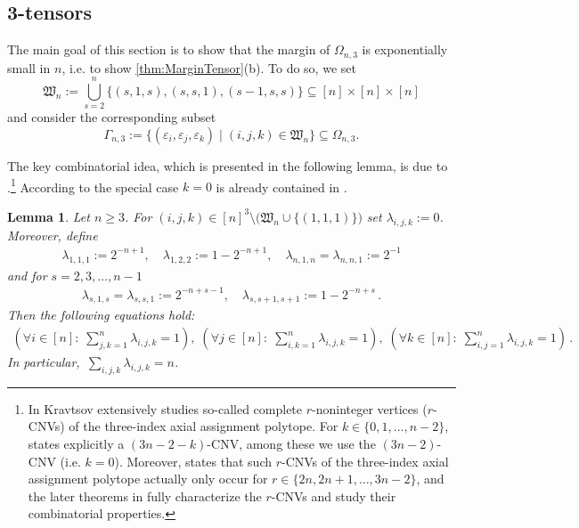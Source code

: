 \documentclass[10pt,a4paper]{article}
\newtheorem{lem}[thm]{Lemma}\crefname{lem}{Lemma}{Lemmas}
\numberwithin{equation}{section}
\newcommand{\eps}{\varepsilon}
\begin{document}
\subsection{3-tensors}\label{sec:3tensors}

The main goal of this section is to show that the margin of $\Omega_{n,3}$ is exponentially small in $n$, i.e. to show \cref{thm:MarginTensor}(b). To do so, we set
\begin{equation}
\mathfrak{W}_n := \bigcup_{s=2}^n \lbrace (s,1,s), (s,s,1), (s-1,s,s) \rbrace \subseteq [n] \times [n] \times [n]
\end{equation}
and consider the corresponding subset
\begin{equation}
\Gamma_{n,3} := \big\lbrace (\eps_i,\eps_j,\eps_k) \mid (i,j,k) \in \mathfrak{W}_n \big \rbrace \subseteq \Omega_{n,3}.
\end{equation}

The key combinatorial idea, which is presented in the following lemma, is due to \cite[Theorem~1 with $k=0$]{krav}.\footnote{In \cite{krav} Kravtsov extensively studies so-called complete $r$-noninteger vertices ($r$-CNVs) of the three-index axial assignment polytope. For $k \in \{0,1,\ldots,n-2\}$, \cite[Theorem~1]{krav} states explicitly a $(3n-2-k)$-CNV, among these we use the $(3n-2)$-CNV (i.e. $k=0$). Moreover, \cite[Theorem~2]{krav} states that such $r$-CNVs of the three-index axial assignment polytope actually only occur for $r \in \{2n,2n+1, \ldots, 3n-2\}$, and the later theorems in \cite{krav} fully characterize the $r$-CNVs and study their combinatorial properties.}  According to \cite{krav} the special case $k=0$ is already contained in \cite[Theorem~9]{luk}.

\begin{lem}\label{lem:Kravtsov}
Let $n \geq 3$. For $(i,j,k) \in [n]^3 \setminus \big(\mathfrak{W}_n \cup \lbrace (1,1,1) \rbrace \big)$ set $\lambda_{i,j,k} := 0$. Moreover, define
\begin{align*}
\lambda_{1,1,1} := 2^{-n+1}, \quad \lambda_{1,2,2} := 1- 2^{-n+1}, \quad \lambda_{n,1,n} = \lambda_{n,n,1} := 2^{-1}
\end{align*}
and for $s=2,3,\ldots,n-1$
\begin{align*}
\lambda_{s,1,s} = \lambda_{s,s,1} := 2^{-n+s-1} ,\quad \lambda_{s,s+1,s+1} := 1-2^{-n+s} \, .
\end{align*}
Then the following equations hold:
\begin{align}
\left( \forall i \in [n]: \; \sum_{j,k = 1}^n \lambda_{i,j,k} = 1 \right), \;
\left( \forall j \in [n]: \; \sum_{i,k = 1}^n \lambda_{i,j,k} = 1 \right), \;
\left( \forall k \in [n]: \; \sum_{i,j = 1}^n \lambda_{i,j,k} = 1 \right) \, .\label{eq:marginals-krav}
\end{align}
In particular, $\,\sum_{i,j,k} \lambda_{i,j,k} = n$.
\end{lem}
\end{document}
